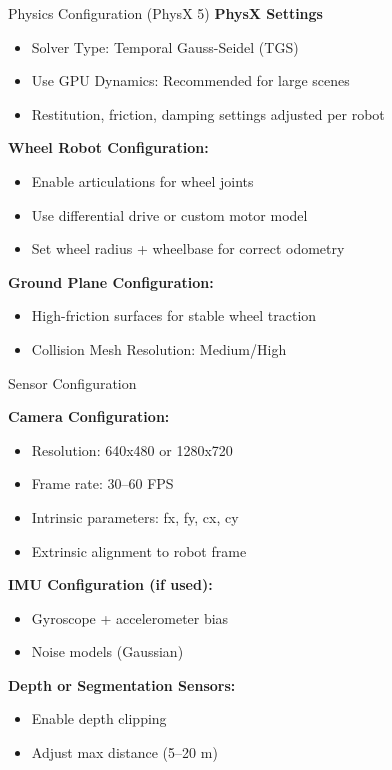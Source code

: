 \begin{frame}{Physics Configuration (PhysX 5)}
\textbf{PhysX Settings}
\begin{itemize}
    \item Solver Type: Temporal Gauss-Seidel (TGS)  
    \item Use GPU Dynamics: Recommended for large scenes  
    \item Restitution, friction, damping settings adjusted per robot  
\end{itemize}

\textbf{Wheel Robot Configuration:}
\begin{itemize}
    \item Enable articulations for wheel joints  
    \item Use differential drive or custom motor model  
    \item Set wheel radius + wheelbase for correct odometry  
\end{itemize}

\textbf{Ground Plane Configuration:}
\begin{itemize}
    \item High-friction surfaces for stable wheel traction  
    \item Collision Mesh Resolution: Medium/High  
\end{itemize}

\end{frame}

\begin{frame}{Sensor Configuration}

\textbf{Camera Configuration:}
\begin{itemize}
    \item Resolution: 640x480 or 1280x720  
    \item Frame rate: 30–60 FPS  
    \item Intrinsic parameters: fx, fy, cx, cy  
    \item Extrinsic alignment to robot frame  
\end{itemize}

\textbf{IMU Configuration (if used):}
\begin{itemize}
    \item Gyroscope + accelerometer bias  
    \item Noise models (Gaussian)  
\end{itemize}

\textbf{Depth or Segmentation Sensors:}
\begin{itemize}
    \item Enable depth clipping  
    \item Adjust max distance (5–20 m)  
\end{itemize}

\end{frame}

